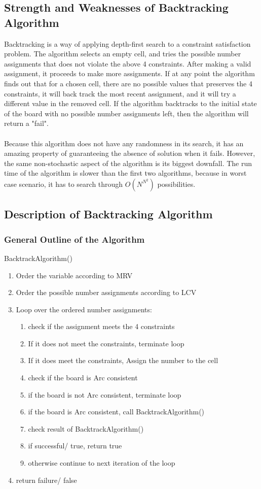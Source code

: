 \documentclass[12pt, a4paper]{article}
\begin{document}
		\subsection{Strength and Weaknesses of Backtracking Algorithm}
			Backtracking is a way of applying depth-first search to a constraint satisfaction problem. The algorithm selects an empty cell, and tries the possible number assignments that does not violate the above 4 constraints. After making a valid assignment, it proceeds to make more assignments. If at any point the algorithm finds out that for a chosen cell, there are no possible values that preserves the 4 constraints, it will back track the most recent assignment, and it will try a different value in the removed cell. If the algorithm backtracks to the initial state of the board with no possible number assignments left, then the algorithm will return a "fail".\\\\
			Because this algorithm does not have any randomness in its search, it has an amazing property of guaranteeing the absence of solution when it fails. However, the same non-stochastic aspect of the algorithm is its biggest downfall. The run time of the algorithm is slower than the first two algorithms, because in worst case scenario, it has to search through $O(N^{N^2})$ possibilities.
		\subsection{Description of Backtracking Algorithm}
			\subsubsection{General Outline of the Algorithm}
				BacktrackAlgorithm()
				\begin{enumerate}
					\item Order the variable according to MRV
					\item Order the possible number assignments according to LCV
					\item Loop over the ordered number assignments:
					\begin{enumerate}
						\item check if the assignment meets the 4 constraints
						\item If it does not meet the constraints, terminate loop
						\item If it does meet the constraints, Assign the number to the cell
						\item check if the board is Arc consistent
						\item if the board is not Arc consistent, terminate loop
						\item if the board is Arc consistent, call BacktrackAlgorithm()
						\item check result of BacktrackAlgorithm()
						\item if successful/ true, return true
						\item otherwise continue to next iteration of the loop
					\end{enumerate}
					\item return failure/ false
				\end{enumerate}
\end{document}
